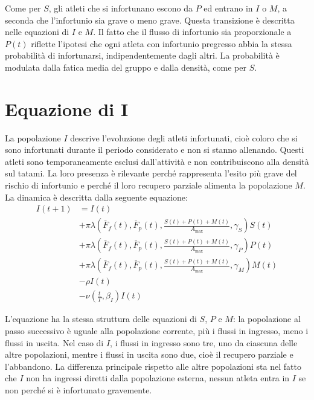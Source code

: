Come per $S$, gli atleti che si infortunano escono da $P$ ed entrano in $I$ o $M$, a seconda che l'infortunio sia grave o meno grave. Questa transizione è descritta nelle equazioni di $I$ e $M$. Il fatto che il flusso di infortunio sia proporzionale a $P(t)$ riflette l'ipotesi che ogni atleta con infortunio pregresso abbia la stessa probabilità di infortunarsi, indipendentemente dagli altri. La probabilità è modulata dalla fatica media del gruppo e dalla densità, come per $S$.

\section{Equazione di I}

La popolazione $I$ descrive l'evoluzione degli atleti infortunati, cioè coloro che si sono infortunati durante il periodo considerato e non si stanno allenando. Questi atleti sono temporaneamente esclusi dall'attività e non contribuiscono alla densità sul tatami. La loro presenza è rilevante perché rappresenta l'esito più grave del rischio di infortunio e perché il loro recupero parziale alimenta la popolazione $M$. La dinamica è descritta dalla seguente equazione:
\begin{align*}
    I(t+1) &= I(t) \\
        &+ \pi \lambda\left(\bar{F}_f(t), \bar{F}_p(t), \frac{S(t) + P(t) + M(t)}{A_{\max}}, \gamma_S\right) S(t) \\
        &+ \pi \lambda\left(\bar{F}_f(t), \bar{F}_p(t), \frac{S(t) + P(t) + M(t)}{A_{\max}}, \gamma_P\right) P(t) \\
        &+ \pi \lambda\left(\bar{F}_f(t), \bar{F}_p(t), \frac{S(t) + P(t) + M(t)}{A_{\max}}, \gamma_M\right) M(t) \\
        &- \rho I(t) \\
        &- \nu\left(\frac{t}{T}, \beta_I\right) I(t)
\end{align*}

L'equazione ha la stessa struttura delle equazioni di $S$, $P$ e $M$: la popolazione al passo successivo è uguale alla popolazione corrente, più i flussi in ingresso, meno i flussi in uscita. Nel caso di $I$, i flussi in ingresso sono tre, uno da ciascuna delle altre popolazioni, mentre i flussi in uscita sono due, cioè il recupero parziale e l'abbandono. La differenza principale rispetto alle altre popolazioni sta nel fatto che $I$ non ha ingressi diretti dalla popolazione esterna, nessun atleta entra in $I$ se non perché si è infortunato gravemente.

